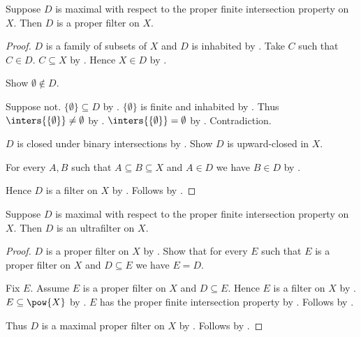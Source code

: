\begin{theorem}\label{maximal_proper_fip_is_proper_filter}
    Suppose $D$ is maximal with respect to the proper finite intersection property on $X$.
    Then $D$ is a proper filter on $X$.
\end{theorem}
\begin{proof}
    $D$ is a family of subsets of $X$ and $D$ is inhabited
        by .
    Take $C$ such that $C\in D$.
    $C\subseteq X$ by
        .
    Hence $X\in D$ by
        .

    Show $\emptyset\notin D$.
    \begin{subproof}
        Suppose not.
        $\{\emptyset\}\subseteq D$ by .
        $\{\emptyset\}$ is finite and inhabited
            by .
        Thus $\inters{\{\emptyset\}}\neq\emptyset$ by
            .
        $\inters{\{\emptyset\}}=\emptyset$ by .
        Contradiction.
    \end{subproof}

    $D$ is closed under binary intersections
        by .
    Show $D$ is upward-closed in $X$.
    \begin{subproof}
        For every $A,B$ such that $A\subseteq B\subseteq X$ and $A\in D$
            we have $B\in D$ by .
    \end{subproof}
    Hence $D$ is a filter on $X$ by .
    Follows by .
\end{proof}

\begin{theorem}\label{maximal_proper_fip_is_ultrafilter}
    Suppose $D$ is maximal with respect to the proper finite intersection property on $X$.
    Then $D$ is an ultrafilter on $X$.
\end{theorem}
\begin{proof}
    $D$ is a proper filter on $X$
        by .
    Show that for every $E$ such that
        $E$ is a proper filter on $X$ and $D\subseteq E$
        we have $E=D$.
    \begin{subproof}
        Fix $E$.
        Assume $E$ is a proper filter on $X$ and $D\subseteq E$.
        Hence $E$ is a filter on $X$ by .
        $E\subseteq\pow{X}$ by .
        $E$ has the proper finite intersection property by
            .
        Follows by .
    \end{subproof}
    Thus $D$ is a maximal proper filter on $X$
        by .
    Follows by .
\end{proof}

